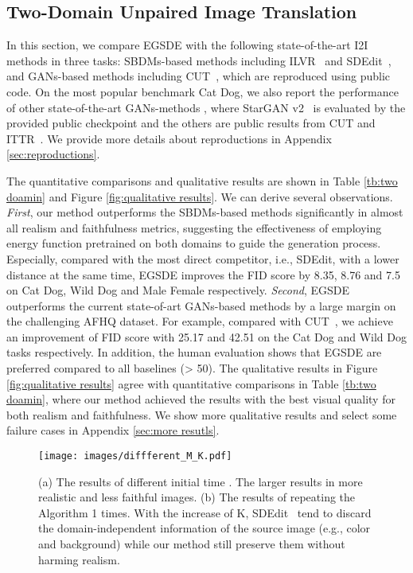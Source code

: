 \documentclass{article}
\begin{document}
\subsection{Two-Domain Unpaired Image Translation}
In this section, we compare EGSDE with the following state-of-the-art I2I methods in three tasks: SBDMs-based methods including ILVR~\cite{choi2021ilvr} and SDEdit~\cite{meng2021sdedit}, and GANs-based methods including CUT~\cite{park2020contrastive}, which are reproduced using public code. On the most popular benchmark Cat  Dog, we also report the performance of other state-of-the-art GANs-methods , where StarGAN v2~\cite{choi2020stargan} is evaluated by the provided public checkpoint and the others are public results from CUT\cite{park2020contrastive} and ITTR~\cite{zheng2022ittr}. We provide more details about reproductions in Appendix \ref{sec:reproductions}. 

The quantitative comparisons and qualitative results are shown in Table \ref{tb:two doamin} and Figure \ref{fig:qualitative results}. We can derive several observations. \emph{First}, our method outperforms the SBDMs-based methods significantly in almost all realism and faithfulness metrics, suggesting the effectiveness of employing energy function pretrained on both domains to guide the generation process. Especially, compared with the most direct competitor, i.e., SDEdit, with a lower  distance at the same time, EGSDE improves the FID score by 8.35, 8.76 and 7.5 on Cat  Dog, Wild  Dog and Male  Female respectively. \emph{Second}, EGSDE outperforms the current state-of-art GANs-based methods by a large margin on the challenging AFHQ dataset. For example, compared with CUT~\cite{park2020contrastive}, we achieve an improvement of FID score with 25.17 and 42.51 on the Cat  Dog and Wild  Dog tasks respectively. In addition, the human evaluation shows that EGSDE are preferred compared to all baselines (> 50). The qualitative results in Figure \ref{fig:qualitative results} agree with quantitative comparisons in Table \ref{tb:two doamin}, where our method achieved the results with the best visual quality for both realism and faithfulness.  We show more qualitative results and select some failure cases in Appendix \ref{sec:more resutls}.        
    






\begin{figure}
  \centering
  \texttt{[image: images/diffferent\_M\_K.pdf]}
  \caption{(a) The results of different initial time . The larger  results in more realistic and less faithful images. (b) The results of repeating the Algorithm 1  times. With the increase of K, SDEdit~\cite{meng2021sdedit} tend to discard the domain-independent information of the source image (e.g., color and background) while our method still preserve them without harming realism.}
  \label{fig:K}
  \vspace{-0.5cm}
\end{figure}
\end{document}
